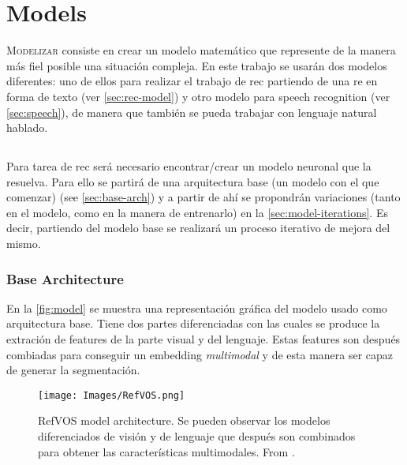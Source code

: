

\chapter{Models}\label{cha:model}



\lettrine{M}{odelizar} consiste en crear un modelo matemático que represente de
la manera más fiel posible una situación compleja. En este trabajo se usarán
dos modelos diferentes: uno de ellos para realizar el trabajo de \gls{rec}
partiendo de una \gls{re} en forma de texto (ver \vref{sec:rec-model}) y otro
modelo para speech recognition (ver \vref{sec:speech}), de manera que también
se pueda trabajar con lenguaje natural hablado.


\section{}\label{sec:rec-model}

Para tarea de \gls{rec} será necesario encontrar/crear un modelo neuronal que
la resuelva. Para ello se partirá de una arquitectura base (un modelo con el
que comenzar) (see \vref{sec:base-arch}) y a partir de ahí se propondrán
variaciones (tanto en el modelo, como en la manera de entrenarlo) en la
\vref{sec:model-iterations}. Es decir, partiendo del modelo base se realizará
un proceso iterativo de mejora del mismo.

\subsection{Base Architecture}\label{sec:base-arch}

En la \vref{fig:model} se muestra una representación gráfica del modelo usado
como arquitectura base. Tiene dos partes diferenciadas con las cuales se
produce la extración de features de la parte visual y del lenguaje. Estas
features son después combiadas para conseguir un embedding \emph{multimodal} y
de esta manera ser capaz de generar la segmentación.

\begin{figure}[ht]
  \centering
  \texttt{[image: Images/RefVOS.png]}
  \caption[RefVOS model architecture]{RefVOS model architecture. Se pueden
    observar los modelos diferenciados de visión y de lenguaje que después son
    combinados para obtener las características multimodales. From
    .}\label{fig:model}
\end{figure}

